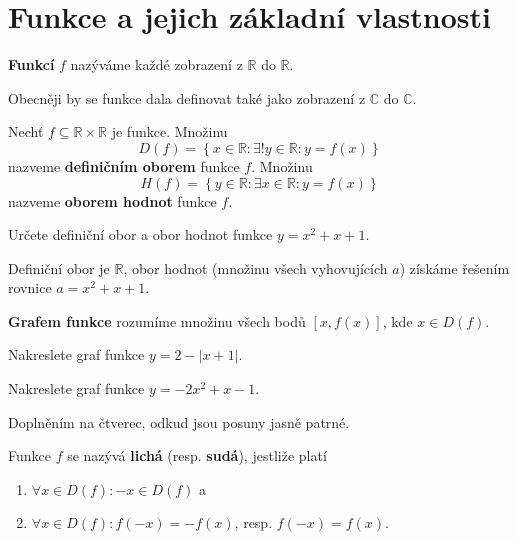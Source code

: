 \section{Funkce a jejich základní vlastnosti}
\begin{definition}
  \textbf{Funkcí} $f$ nazýváme každé zobrazení z $\mathbb R$ do $\mathbb R$.
\end{definition}

\begin{pozn}
  Obecněji by se funkce dala definovat také jako zobrazení z $\mathbb C$ do $\mathbb C$.
\end{pozn}

\begin{definition}
  Nechť $f\subseteq \mathbb R \times \mathbb R$ je funkce. Množinu
  \[
    D(f) = \left  \{ x \in \mathbb R:\exists ! y \in \mathbb R:y=f(x) \right \}
  \]
  nazveme \textbf{definičním oborem} funkce $f$. Množinu
  \[
    H(f) = \left  \{ y \in \mathbb R:\exists  x \in \mathbb R:y=f(x) \right \}
  \]
  nazveme \textbf{oborem hodnot} funkce $f$.
\end{definition}

\begin{priklad}
Určete definiční obor a obor hodnot funkce $y=x^2+x+1.$
\end{priklad}

\begin{reseni}
Definiční obor je $\mathbb R$, obor hodnot (množinu všech vyhovujících $a$)
získáme řešením rovnice $a=x^2+x+1.$
\end{reseni}

\begin{pozn}
  \textbf{Grafem funkce} rozumíme množinu všech bodů $[x,f(x)]$, kde $x\in D(f).$
\end{pozn}

\begin{priklad}
Nakreslete graf funkce $y=2-|x+1|.$
\end{priklad}

\begin{priklad}
Nakreslete graf funkce $y=-2x^2+x-1$.
\end{priklad}

\begin{reseni}
Doplněním na čtverec, odkud jsou posuny jasně patrné.
\end{reseni}

\begin{definition}
  Funkce $f$ se nazývá \textbf{lichá} (resp. \textbf{sudá}), jestliže platí
  \begin{enumerate}[$i.$]
    \item $\forall x \in D(f): -x \in D(f)$ a
  	\item $\forall x \in D(f): f(-x)=-f(x)$, resp. $f(-x)=f(x)$.
  \end{enumerate}
\end{definition}


